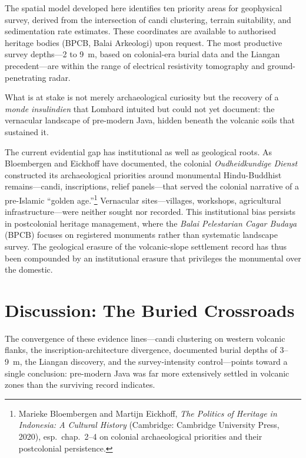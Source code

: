 \documentclass[12pt,a4paper]{article}
\begin{document}
The spatial model developed here identifies ten priority areas for geophysical survey, derived from the intersection of candi clustering, terrain suitability, and sedimentation rate estimates.
These coordinates are available to authorised heritage bodies (BPCB, Balai Arkeologi) upon request.
The most productive survey depths---2 to 9~m, based on colonial-era burial data and the Liangan precedent---are within the range of electrical resistivity tomography and ground-penetrating radar.

What is at stake is not merely archaeological curiosity but the recovery of a \emph{monde insulindien} that Lombard intuited but could not yet document: the vernacular landscape of pre-modern Java, hidden beneath the volcanic soils that sustained it.

The current evidential gap has institutional as well as geological roots.
As Bloembergen and Eickhoff have documented, the colonial \emph{Oudheidkundige Dienst} constructed its archaeological priorities around monumental Hindu-Buddhist remains---candi, inscriptions, relief panels---that served the colonial narrative of a pre-Islamic ``golden age.''\footnote{Marieke Bloembergen and Martijn Eickhoff, \emph{The Politics of Heritage in Indonesia: A Cultural History} (Cambridge: Cambridge University Press, 2020), esp.\ chap.~2--4 on colonial archaeological priorities and their postcolonial persistence.}
Vernacular sites---villages, workshops, agricultural infrastructure---were neither sought nor recorded.
This institutional bias persists in postcolonial heritage management, where the \emph{Balai Pelestarian Cagar Budaya} (BPCB) focuses on registered monuments rather than systematic landscape survey.
The geological erasure of the volcanic-slope settlement record has thus been compounded by an institutional erasure that privileges the monumental over the domestic.


\section{Discussion: The Buried Crossroads}

The convergence of these evidence lines---candi clustering on western volcanic flanks, the inscription-architecture divergence, documented burial depths of 3--9~m, the Liangan discovery, and the survey-intensity control---points toward a single conclusion: pre-modern Java was far more extensively settled in volcanic zones than the surviving record indicates.
\end{document}
